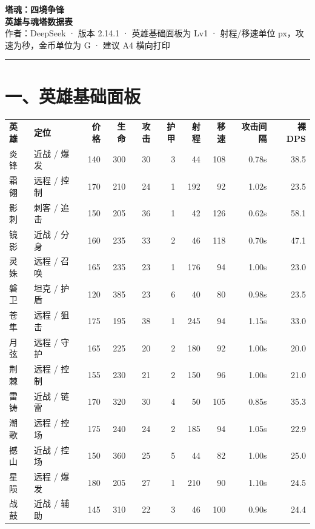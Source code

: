 \documentclass{ctexart}
\begin{document}
\begin{center}
{\sffamily\bfseries\fontsize{23}{27}\selectfont 塔魂：四境争锋}\\[2pt]
{\sffamily\bfseries\fontsize{16}{19}\selectfont 英雄与魂塔数据表}\\[4pt]
{\small 作者：DeepSeek \quad · \quad 版本 2.14.1 \quad · \quad 英雄基础面板为 Lv1 \quad · \quad 射程/移速单位 px，攻速为秒，金币单位为 G \quad · \quad 建议 A4 横向打印}\\[5pt]
{\color{teal}\rule{\textwidth}{1.1pt}}
\end{center}

\section*{一、英雄基础面板}

{\footnotesize
\begin{tabularx}{\textwidth}{@{}l l r r r r r r r r@{}}
\rowcolor{teal}\color{white}\bfseries 英雄 & \color{white}\bfseries 定位 & \color{white}\bfseries 价格 & \color{white}\bfseries 生命 & \color{white}\bfseries 攻击 & \color{white}\bfseries 护甲 & \color{white}\bfseries 射程 & \color{white}\bfseries 移速 & \color{white}\bfseries 攻击间隔 & \color{white}\bfseries 裸 DPS \\
炎锋 & 近战 / 爆发 & 140 & 300 & 30 & 3 & 44 & 108 & 0.78s & 38.5 \\
霜翎 & 远程 / 控制 & 170 & 210 & 24 & 1 & 192 & 92 & 1.02s & 23.5 \\
影刺 & 刺客 / 追击 & 150 & 205 & 36 & 1 & 42 & 126 & 0.62s & 58.1 \\
镜影 & 近战 / 分身 & 160 & 235 & 33 & 2 & 46 & 118 & 0.70s & 47.1 \\
灵姝 & 远程 / 召唤 & 165 & 235 & 23 & 1 & 176 & 94 & 1.00s & 23.0 \\
磐卫 & 坦克 / 护盾 & 120 & 385 & 23 & 6 & 40 & 80 & 0.98s & 23.5 \\
苍隼 & 远程 / 狙击 & 175 & 195 & 38 & 1 & 245 & 94 & 1.15s & 33.0 \\
月弦 & 远程 / 守护 & 165 & 225 & 20 & 2 & 180 & 92 & 1.00s & 20.0 \\
荆棘 & 远程 / 控制 & 155 & 230 & 21 & 2 & 150 & 96 & 1.00s & 21.0 \\
雷铸 & 近战 / 链雷 & 170 & 320 & 30 & 4 & 50 & 105 & 0.85s & 35.3 \\
潮歌 & 远程 / 控场 & 175 & 240 & 24 & 2 & 185 & 94 & 1.05s & 22.9 \\
撼山 & 近战 / 控场 & 150 & 360 & 25 & 5 & 44 & 82 & 1.00s & 25.0 \\
星陨 & 远程 / 爆发 & 180 & 205 & 27 & 1 & 210 & 90 & 1.10s & 24.5 \\
战鼓 & 近战 / 辅助 & 145 & 310 & 22 & 3 & 46 & 100 & 0.90s & 24.4 \\
\end{tabularx}
}
\end{document}
